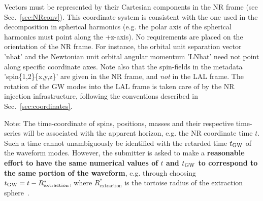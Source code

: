 \documentclass[11pt,tightenlines,article,amssymb,amsmath,amsfonts,superscriptaddress,nofootinbib]{revtex4}
\newcommand{\tGW}{t_{\rm GW}}
\begin{document}
Vectors must be represented by their Cartesian components in the NR frame (see Sec.~\ref{sec:NRconv}). This coordinate system is consistent with the one used in the decomposition in spherical harmonics (e.g. the polar axis of the spherical harmonics must point along the +z-axis). No requirements are placed on the orientation of the NR frame. For instance, the orbital unit separation vector 'nhat' and the Newtonian unit orbital angular momentum 'LNhat' need not point along specific coordinate axes. Note also that the spin-fields in the metadata 'spin\{1,2\}\{x,y,z\}' are given in the NR frame, and \emph{not} in the LAL frame. The rotation of the GW modes into the LAL frame is taken care of by the NR injection infrastructure, following the conventions described in Sec.~\ref{sec:coordinates}. 

Note: The time-coordinate of spins, positions, masses and their
respective time-series will be associated with the apparent horizon,
e.g. the NR coordinate time $t$. Such a time cannot
unambiguously be identified with the retarded time $\tGW$ of the
waveform modes.
\label{tGW-vs-tNR}
However, the submitter is asked to make a {\bf reasonable
effort to have the same numerical values of $t$ and $\tGW$
to correspond to the same portion of the waveform}, e.g. through
choosing $\tGW = t - R^*_\mathrm{extraction}$, where
$R^*_\mathrm{extraction}$ is the tortoise radius of the extraction sphere~\cite{Fiske:2005fx,Boyle:2009vi}. \\
\newline

\noindent
\end{document}

